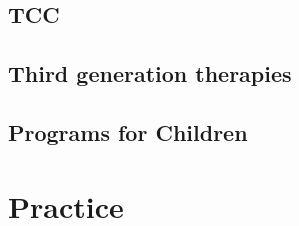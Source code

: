 \documentclass[]{book}
\begin{document}
\hypertarget{tcc}{%
\section{TCC}\label{tcc}}

\hypertarget{third-generation-therapies}{%
\section{Third generation therapies}\label{third-generation-therapies}}

\hypertarget{programs-for-children}{%
\section{Programs for Children}\label{programs-for-children}}

\hypertarget{practice}{%
\chapter{Practice}\label{practice}}
\end{document}
